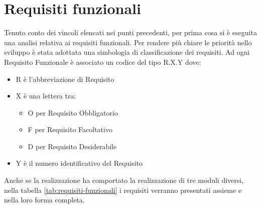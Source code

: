 \section{Requisiti funzionali}
Tenuto conto dei vincoli elencati nei punti precedenti, per prima cosa si è eseguita una analisi relativa ai requisiti funzionali.
Per rendere più chiare le priorità nello sviluppo è stata adottata una simbologia di
classificazione dei requisiti.
Ad ogni Requisito Funzionale è associato un codice del tipo R.X.Y dove:
\begin{itemize}
\item R è l’abbreviazione di Requisito
\item X è una lettera tra:
\begin{itemize}
	\item O per Requisito Obbligatorio
	\item F per Requisito Facoltativo
	\item D per Requisito Desiderabile
\end{itemize}
\item Y è il numero identificativo del Requisito
\end{itemize}
Anche se la realizzazione ha comportato la realizzazione di tre moduli diversi, nella tabella \ref{tab:requisiti-funzionali} i requisiti verranno presentati assieme e nella loro forma completa.
\begingroup
\renewcommand\arraystretch{2}
